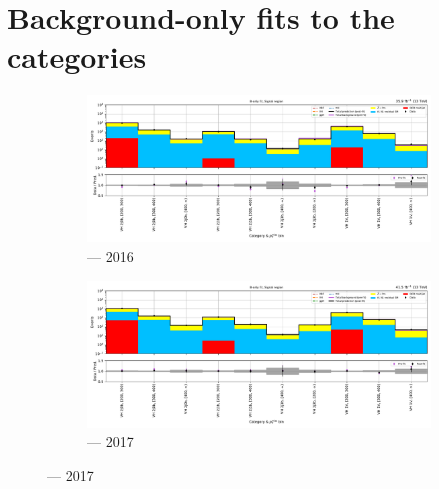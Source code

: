 \clearpage




\section{Background-only fits to the \texorpdfstring{\VH}{VH} categories}
\label{sec:B_only_fit_plots_VH_SR}

\begin{figure}[htbp]
    \centering
    \begin{subfigure}[b]{0.79\textwidth}
        \includegraphics[width=\textwidth]{chapters/higgstoinv/figures/mountain_ranges/2016/VH/SR_tree_fit_b-abs_values_VH_cats.pdf}
        \caption{\VH --- 2016}
    \end{subfigure}

    \begin{subfigure}[b]{0.79\textwidth}
        \includegraphics[width=\textwidth]{chapters/higgstoinv/figures/mountain_ranges/2017/VH/SR_tree_fit_b-abs_values_VH_cats.pdf}
        \caption{\VH --- 2017}
    \end{subfigure}


\end{figure}

